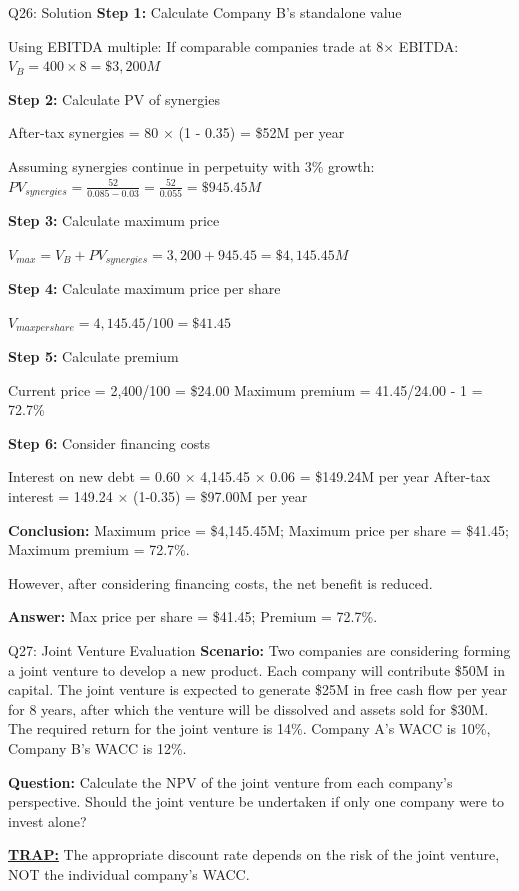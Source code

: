 \documentclass{beamer}
\renewcommand{\scriptsize}{\fontsize{6pt}{7pt}\selectfont}
\begin{document}
	\begin{frame}{Q26: Solution}
		\scriptsize
		\textbf{Step 1:} Calculate Company B's standalone value
		
		Using EBITDA multiple: If comparable companies trade at 8× EBITDA:
		$V_B = 400 \times 8 = \$3,200M$
		
		\vspace{2pt}
		\textbf{Step 2:} Calculate PV of synergies
		
		After-tax synergies = 80 × (1 - 0.35) = \$52M per year
		
		Assuming synergies continue in perpetuity with 3\% growth:
		$PV_{synergies} = \frac{52}{0.085 - 0.03} = \frac{52}{0.055} = \$945.45M$
		
		\vspace{2pt}
		\textbf{Step 3:} Calculate maximum price
		
		$V_{max} = V_B + PV_{synergies} = 3,200 + 945.45 = \$4,145.45M$
		
		\vspace{2pt}
		\textbf{Step 4:} Calculate maximum price per share
		
		$V_{max per share} = 4,145.45/100 = \$41.45$
		
		\vspace{2pt}
		\textbf{Step 5:} Calculate premium
		
		Current price = 2,400/100 = \$24.00
		Maximum premium = 41.45/24.00 - 1 = 72.7\%
		
		\vspace{2pt}
		\textbf{Step 6:} Consider financing costs
		
		Interest on new debt = 0.60 × 4,145.45 × 0.06 = \$149.24M per year
		After-tax interest = 149.24 × (1-0.35) = \$97.00M per year
		
		\vspace{2pt}
		\textbf{Conclusion:} Maximum price = \$4,145.45M; Maximum price per share = \$41.45; Maximum premium = 72.7\%.
		
		However, after considering financing costs, the net benefit is reduced.
		
		\textbf{Answer:} Max price per share = \$41.45; Premium = 72.7\%.
	\end{frame}
	
	\begin{frame}{Q27: Joint Venture Evaluation}
		\scriptsize
		\textbf{Scenario:} Two companies are considering forming a joint venture to develop a new product. Each company will contribute \$50M in capital. The joint venture is expected to generate \$25M in free cash flow per year for 8 years, after which the venture will be dissolved and assets sold for \$30M. The required return for the joint venture is 14\%. Company A's WACC is 10\%, Company B's WACC is 12\%.
		
		\textbf{Question:} Calculate the NPV of the joint venture from each company's perspective. Should the joint venture be undertaken if only one company were to invest alone?
		
		\vspace{2pt}
		\underline{\textbf{TRAP:}} The appropriate discount rate depends on the risk of the joint venture, NOT the individual company's WACC.
	\end{frame}
	
\end{document}
